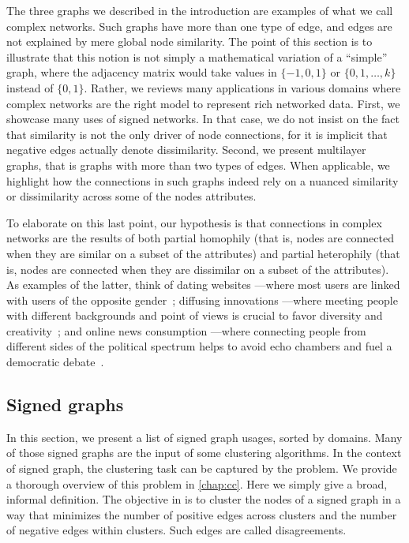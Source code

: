 The three graphs we described in the introduction are examples of what we call complex networks.
Such graphs have more than one type of edge, and edges are not explained by mere global node
similarity. The point of this section is to illustrate that this notion is not simply a mathematical
variation of a \enquote{simple} graph, where the adjacency matrix would take values in $\{-1, 0, 1\}$ or
$\{0, 1, \ldots, k\}$ instead of $\{0, 1\}$. Rather, we reviews many applications in various domains
where complex networks are the right model to represent rich networked data. First, we showcase many
uses of signed networks. In that case, we do not insist on the fact that similarity is not the only
driver of node connections, for it is implicit that negative edges actually denote dissimilarity.
Second, we present multilayer graphs, that is graphs with more than two types of edges. When
applicable, we highlight how the connections in such graphs indeed rely on a nuanced similarity or
dissimilarity across some of the nodes attributes.

To elaborate on this last point, our hypothesis is that connections in complex networks are the
results of both partial homophily (that is, nodes are connected when they are similar on a subset of
the attributes) and partial heterophily (that is, nodes are connected when they are dissimilar on a
subset of the attributes). As examples of the latter, think of dating websites ---where most users
are linked with users of the opposite gender~\autocites{homophilyMyspace09}{Tinder16}; diffusing
innovations ---where meeting people with different backgrounds and point of views is crucial to
favor diversity and creativity~\autocite{rogers2003diffusion}; and online news consumption ---where
connecting people from different sides of the political spectrum helps to avoid echo chambers and
fuel a democratic debate~\autocite{balancedNews17}.

\subsection{Signed graphs}
\label{sub:intro_signed_graphs}

In this section, we present a list of signed graph usages, sorted by domains. Many of those signed
graphs are the input of some clustering algorithms. In the context of signed graph, the clustering
task can be captured by the \pcc{} problem. We provide a thorough overview of this problem in
\autoref{chap:cc}. Here we simply give a broad, informal definition. The objective in \pcc{} is to
cluster the nodes of a signed graph in a way that minimizes the number of positive edges across
clusters and the number of negative edges within clusters. Such edges are called disagreements.


